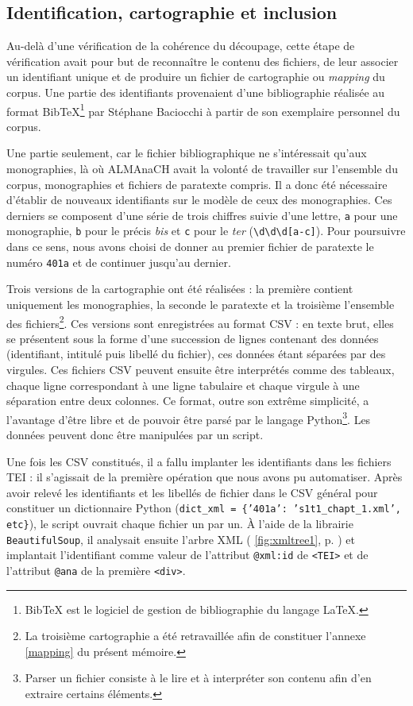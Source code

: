 \subsection{Identification, cartographie et inclusion}

Au-delà d'une vérification de la cohérence du découpage, cette étape de vérification avait pour but de reconnaître le contenu des fichiers, de leur associer un identifiant unique et de produire un fichier de cartographie ou \og \textit{mapping} \fg{} du corpus. Une partie des identifiants provenaient d'une bibliographie réalisée au format BibTeX\footnote{BibTeX est le logiciel de gestion de bibliographie du langage \LaTeX.} par Stéphane Baciocchi à partir de son exemplaire personnel du corpus.

Une partie seulement, car le fichier bibliographique ne s'intéressait qu'aux monographies, là où ALMAnaCH avait la volonté de travailler sur l'ensemble du corpus, monographies et fichiers de paratexte compris. Il a donc été nécessaire d'établir de nouveaux identifiants sur le modèle de ceux des monographies. Ces derniers se composent d'une série de trois chiffres suivie d'une lettre, \texttt{a} pour une monographie, \texttt{b} pour le précis \textit{bis} et \texttt{c} pour le \textit{ter} (\texttt{\textbackslash d\textbackslash d\textbackslash d[a-c]}). Pour poursuivre dans ce sens, nous avons choisi de donner au premier fichier de paratexte le numéro \texttt{401a} et de continuer jusqu'au dernier.

Trois versions de la cartographie ont été réalisées : la première contient uniquement les monographies, la seconde le paratexte et la troisième l'ensemble des fichiers\footnote{La troisième cartographie a été retravaillée afin de constituer l'annexe \ref{mapping} du présent mémoire.}. Ces versions sont enregistrées au format CSV : en texte brut, elles se présentent sous la forme d'une succession de lignes contenant des données (identifiant, intitulé puis libellé du fichier), ces données étant séparées par des virgules. Ces fichiers CSV peuvent ensuite être interprétés comme des tableaux, chaque ligne correspondant à une ligne tabulaire et chaque virgule à une séparation entre deux colonnes. Ce format, outre son extrême simplicité, a l'avantage d'être libre et de pouvoir être parsé par le langage Python\footnote{Parser un fichier consiste à le lire et à interpréter son contenu afin d’en extraire certains éléments.}. Les données peuvent donc être manipulées par un script.

Une fois les CSV constitués, il a fallu implanter les identifiants dans les fichiers TEI : il s'agissait de la première opération que nous avons pu automatiser. Après avoir relevé les identifiants et les libellés de fichier dans le CSV général pour constituer un dictionnaire Python (\texttt{dict\_xml = \{'401a': 's1t1\_chapt\_1.xml', etc\}}), le script ouvrait chaque fichier un par un. À l'aide de la librairie \texttt{BeautifulSoup}, il analysait ensuite l'arbre XML (\fig{} \ref{fig:xmltree1}, p. \pageref{fig:xmltree1}) et implantait l'identifiant comme valeur de l'attribut \texttt{@xml:id} de \texttt{<TEI>} et de l'attribut \texttt{@ana} de la première \texttt{<div>}.

